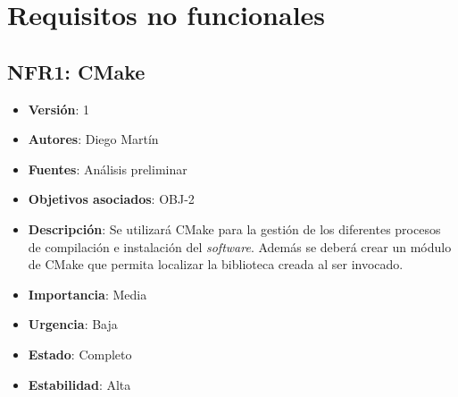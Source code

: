 \documentclass[letterpaper,10pt,spanish]{sphinxmanual}
\begin{document}
\chapter{Requisitos no funcionales}
\label{analysis/nfr:requisitos-no-funcionales}\label{analysis/nfr::doc}

\section{NFR1: CMake}
\label{analysis/nfr:nfr1-cmake}\begin{itemize}
\item {} 
\textbf{Versión}: 1

\item {} 
\textbf{Autores}: Diego Martín

\item {} 
\textbf{Fuentes}: Análisis preliminar

\item {} 
\textbf{Objetivos asociados}: OBJ-2

\item {} 
\textbf{Descripción}: Se utilizará CMake para la gestión de los diferentes procesos de compilación e instalación del \emph{software}. Además se deberá crear un módulo de CMake que permita localizar la biblioteca creada al ser invocado.

\item {} 
\textbf{Importancia}: Media

\item {} 
\textbf{Urgencia}: Baja

\item {} 
\textbf{Estado}: Completo

\item {} 
\textbf{Estabilidad}: Alta

\end{itemize}
\end{document}
